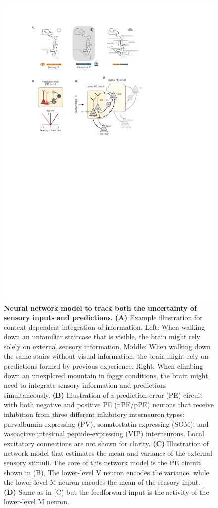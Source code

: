 \documentclass[10pt,a4paper,draft]{article}
\begin{document}
%
\begin{figure}[t!]
	\centering
    \includegraphics{../results/figures/final/Fig_1}
\caption{\footnotesize{\bf Neural network model to track both the uncertainty of sensory inputs and predictions.\newline} 
{\bf (A)} Example illustration for context-dependent integration of information. Left: When walking down an unfamiliar staircase that is visible, the brain might rely solely on external sensory information. Middle: When walking down the same stairs without visual information, the brain might rely on predictions formed by previous experience. Right: When climbing down an unexplored mountain in foggy conditions, the brain might need to integrate sensory information and predictions simultaneously.
{\bf (B)} Illustration of a prediction-error (PE) circuit with both negative and positive PE (nPE/pPE) neurons that receive inhibition from three different inhibitory interneuron types: parvalbumin-expressing (PV), somatostatin-expressing (SOM), and vasoactive intestinal peptide-expressing (VIP) interneurons. Local excitatory connections are not shown for clarity.
{\bf (C)} Illustration of network model that estimates the mean and variance of the external sensory stimuli. The core of this network model is the PE circuit shown in (B). The lower-level V neuron encodes the variance, while the lower-level M neuron encodes the mean of the sensory input.
{\bf (D)} Same as in (C) but the feedforward input is the activity of the lower-level M neuron.
}
\label{fig:Fig_1}
\end{figure}
%
\end{document}
